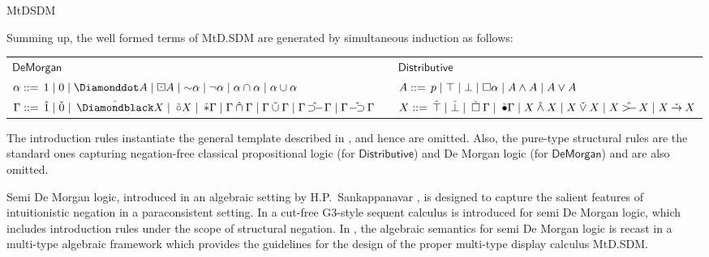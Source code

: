\begin{entry}{MtDSDM}
\begin{clarifications}
Summing up, the well formed terms of MtD.SDM are generated by simultaneous induction as follows:
\begin{center}
{\small
\setlength{\tabcolsep}{0.4em}
\begin{tabular}{@{}lcl@{}}
$\mathsf{De Morgan}$ &  & $\mathsf{Distributive}$\\
$\alpha ::=  \,\dtop  \mid \dbot \mid \wdia A \mid \bbox A \mid   \dneg\alpha \mid \rdneg\alpha \mid \alpha \dand \alpha \mid \alpha \dor \alpha$ & & $A ::= \,p \mid \top \mid \bot \mid \Box \alpha  \mid A \wedge A \mid A \vee A$ \\
$\Gamma ::= \, \DTOP  \mid \DBOT \mid \BDIA X \mid \WCIR X \mid \DNEG \Gamma \mid \Gamma \DAND \Gamma  \mid \Gamma \DOR \Gamma \mid \Gamma \DCRARR \Gamma  \mid \Gamma \DRARR \Gamma$ & & $X ::= \,\XTOP \mid \XBOT \mid \WBOX\Gamma \mid \BCIR\Gamma \mid  X \XAND X  \mid X \XOR X \mid X \XCRARR X \mid X \XRARR X$ \\
\end{tabular}
 }
\end{center}

The introduction rules instantiate the general template described in , and hence are omitted. Also, the pure-type structural rules are the standard ones capturing negation-free classical propositional logic (for $\mathsf{Distributive}$) and De Morgan logic (for $\mathsf{De Morgan}$) and are also omitted.
\end{clarifications}


\begin{history}
Semi De Morgan logic, introduced in an algebraic setting by H.P.~Sankappanavar \cite{sankappanavar1987semi}, is designed to capture the salient features of intuitionistic negation in a paraconsistent setting. In \cite{ma2016sequent}  a cut-free G3-style sequent calculus is introduced for semi De Morgan logic, which includes introduction rules under the scope of structural negation. In \cite{greco2017multi}, the algebraic semantics for semi De Morgan logic is recast in a multi-type algebraic framework which provides the guidelines for the design of the proper multi-type display  calculus MtD.SDM.
\end{history}

\newcommand{\LHK}{\ensuremath{\mathbf{LHK}}\xspace}
\newcommand{\NK}{\ensuremath{\mathbf{NK}}\xspace}



\end{entry}
